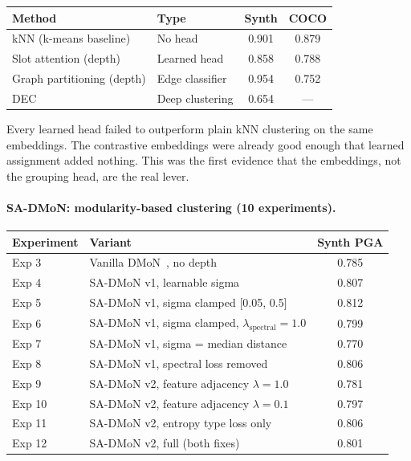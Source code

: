 \begin{tabular}{llcc}
\hline
\textbf{Method} & \textbf{Type} & \textbf{Synth} & \textbf{COCO} \\
\hline
kNN (k-means baseline) & No head & 0.901 & 0.879 \\
Slot attention (depth) & Learned head & 0.858 & 0.788 \\
Graph partitioning (depth) & Edge classifier & 0.954 & 0.752 \\
DEC & Deep clustering & 0.654 & --- \\
\hline
\end{tabular}

\vspace{0.5em}

Every learned head failed to outperform plain kNN clustering on the same embeddings. The contrastive embeddings were already good enough that learned assignment added nothing. This was the first evidence that the embeddings, not the grouping head, are the real lever.

\paragraph{SA-DMoN: modularity-based clustering (10 experiments).}

\begin{tabular}{llc}
\hline
\textbf{Experiment} & \textbf{Variant} & \textbf{Synth PGA} \\
\hline
Exp 3 & Vanilla DMoN~\cite{tsitsulin2023dmon}, no depth & 0.785 \\
Exp 4 & SA-DMoN v1, learnable sigma & 0.807 \\
Exp 5 & SA-DMoN v1, sigma clamped [0.05, 0.5] & 0.812 \\
Exp 6 & SA-DMoN v1, sigma clamped, $\lambda_{\text{spectral}}=1.0$ & 0.799 \\
Exp 7 & SA-DMoN v1, sigma = median distance & 0.770 \\
Exp 8 & SA-DMoN v1, spectral loss removed & 0.806 \\
Exp 9 & SA-DMoN v2, feature adjacency $\lambda=1.0$ & 0.781 \\
Exp 10 & SA-DMoN v2, feature adjacency $\lambda=0.1$ & 0.797 \\
Exp 11 & SA-DMoN v2, entropy type loss only & 0.806 \\
Exp 12 & SA-DMoN v2, full (both fixes) & 0.801 \\
\hline
\end{tabular}


